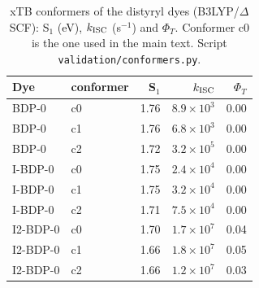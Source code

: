 \begin{table}
  \caption{xTB conformers of the distyryl dyes (B3LYP/$\Delta$SCF): S$_1$ (eV), $k_\mathrm{ISC}$ (s$^{-1}$) and $\Phi_T$.
  Conformer c0 is the one used in the main text. Script
  \texttt{validation/conformers.py}.}
  \label{tab:conf}
  \small
  \begin{tabular}{llrrr}
    \toprule
    Dye & conformer & S$_1$ & $k_\mathrm{ISC}$ & $\Phi_T$ \\
    \midrule
    BDP-0 & c0 & 1.76 & $8.9\times10^{3}$ & 0.00 \\
    BDP-0 & c1 & 1.76 & $6.8\times10^{3}$ & 0.00 \\
    BDP-0 & c2 & 1.72 & $3.2\times10^{5}$ & 0.00 \\
    I-BDP-0 & c0 & 1.75 & $2.4\times10^{4}$ & 0.00 \\
    I-BDP-0 & c1 & 1.75 & $3.2\times10^{4}$ & 0.00 \\
    I-BDP-0 & c2 & 1.71 & $7.5\times10^{4}$ & 0.00 \\
    I2-BDP-0 & c0 & 1.70 & $1.7\times10^{7}$ & 0.04 \\
    I2-BDP-0 & c1 & 1.66 & $1.8\times10^{7}$ & 0.05 \\
    I2-BDP-0 & c2 & 1.66 & $1.2\times10^{7}$ & 0.03 \\
    \bottomrule
  \end{tabular}
\end{table}

